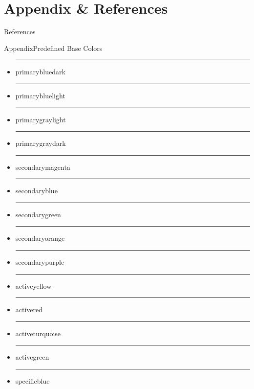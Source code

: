 \documentclass{beamer}
\begin{document}
\section{Appendix \& References}
\appendix 

\begin{frame}[t,allowframebreaks]{References}
	\scriptsize
	\nocite{*}
	
	
\end{frame}

\begin{frame}{Appendix}{Predefined Base Colors}
	\begin{itemize}
		\item {\color{primarybluedark}\rule{.7cm}{.4cm} primarybluedark}
		\item {\color{primarybluelight}\rule{.7cm}{.4cm} primarybluelight}
		\item {\color{primarygraylight}\rule{.7cm}{.4cm} primarygraylight}
		\item {\color{primarygraydark}\rule{.7cm}{.4cm} primarygraydark}
		\item {\color{secondarymagenta}\rule{.7cm}{.4cm} secondarymagenta}
		\item {\color{secondaryblue}\rule{.7cm}{.4cm} secondaryblue}
		\item {\color{secondarygreen}\rule{.7cm}{.4cm} secondarygreen}
		\item {\color{secondaryorange}\rule{.7cm}{.4cm} secondaryorange}
		\item {\color{secondarypurple}\rule{.7cm}{.4cm} secondarypurple}
		\item {\color{activeyellow}\rule{.7cm}{.4cm} activeyellow}
		\item {\color{activered}\rule{.7cm}{.4cm} activered}
		\item {\color{activeturquoise}\rule{.7cm}{.4cm} activeturquoise}
		\item {\color{activegreen}\rule{.7cm}{.4cm} activegreen}
		\item {\color{specificblue}\rule{.7cm}{.4cm} specificblue}
	\end{itemize}
\end{frame}
\end{document}
